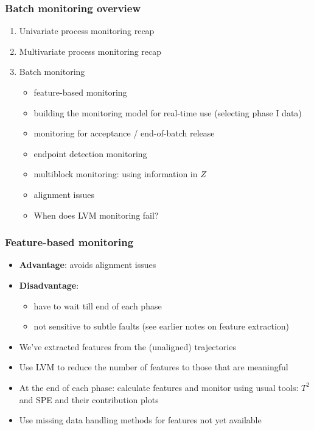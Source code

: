 \begin{frame}\frametitle{Batch monitoring overview}

\begin{enumerate}
	\item 	Univariate process monitoring recap
	
	\item	Multivariate process monitoring recap
	
	\item	Batch monitoring
	
		\begin{itemize}
			\item	feature-based monitoring			
			\item	building the monitoring model for real-time use (selecting phase I data)
			\item	monitoring for acceptance / end-of-batch release
			\item	endpoint detection monitoring
			\item	multiblock monitoring: using information in \( Z \)			
			\item	alignment issues
			\item 	When does LVM monitoring fail?
		\end{itemize}
\end{enumerate}
\end{frame}

\begin{frame}[label=featuremonitoring]\frametitle{Feature-based monitoring}
	
	\begin{itemize}
		\item	\textbf{Advantage}: avoids alignment issues
		
		\item	\textbf{Disadvantage}: 
		
				\begin{itemize}
					\item	have to wait till end of each phase
					
					\item	not sensitive to subtle faults (see earlier notes on feature extraction)
				\end{itemize}\pause
	\end{itemize}
	
	{\color{myOrange}{Approach}}
	\begin{itemize}
		\item	We've extracted features from the (unaligned) trajectories
		
		\item	Use LVM to reduce the number of features to those that are meaningful \pause
		
		\item	At the end of each phase: calculate features and monitor using usual tools: \( T^2 \) and SPE and their contribution plots
		
		\item	Use missing data handling methods for features not yet available
		
	\end{itemize}
\end{frame}

